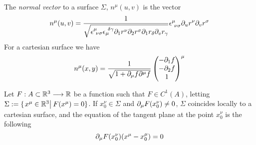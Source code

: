 \documentclass[../complete.tex]{subfiles}
\begin{document}
\begin{dfn}
	The \textit{normal vector} to a surface $\Sigma$, $n^\mu(u,v)$ is the vector
	\begin{equation}
		n^\mu(u,v)=\frac{1}{\sqrt{\epsilon^\mu_{\ \nu\sigma}\epsilon_\mu^{\ \delta\gamma}\del_1r^\nu\del_2r^\sigma\del_1r_\delta\del_vr_\gamma}}\epsilon^\mu_{\ \nu\sigma}\partial_ur^\nu\partial_vr^\sigma
		\label{eq:normalsurf}
	\end{equation}
	For a cartesian surface we have
	\begin{equation}
		n^\mu(x,y)=\frac{1}{\sqrt{1+\partial_\mu f\partial^\mu f}}\begin{pmatrix}-\partial_1f\\-\partial_2f\\1\end{pmatrix}^\mu
		\label{eq:cartsurfnorm}
	\end{equation}
\end{dfn}
\begin{dfn}
	Let $F:A\subset\mathbb{R}^3\overset{}{\longrightarrow}\mathbb{R}$ be a function such that $F\in C^1(A)$, letting $\Sigma:=\{\left.x^\mu\in\mathbb{R}^3\right|_{}F(x^\mu)=0\}$. If $x^\nu_0\in\Sigma$ and $\partial_\mu F(x^\nu_0)\ne0$, $\Sigma$ coincides locally to a cartesian surface, and the equation of the tangent plane at the point $x^\nu_0$ is the following
	\begin{equation}
		\partial_\mu F(x^\nu_0)(x^\mu-x_0^\mu)=0
		\label{eq:tangentimplicitplan}
	\end{equation}
\end{dfn}
\end{document}
